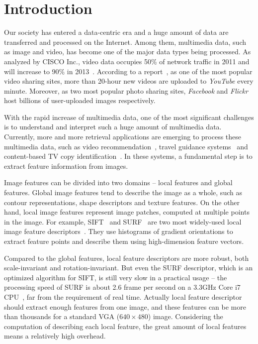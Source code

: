 \section{Introduction}
\label{sec:introduction}

Our society has entered a data-centric era and a huge amount of data are transferred and processed on the Internet. Among them, multimedia data, such as image and video, has become one of the major data types being processed. As analyzed by CISCO Inc., video data occupies 50\% of network traffic in 2011 and will increase to 90\% in 2013~\cite{CISCO2011}.  According to a report~\cite{youtube2009}, as one of the most popular video sharing sites, more than 20-hour new videos are uploaded to \emph{YouTube} every minute. Moreover, as two most popular photo sharing sites, \emph{Facebook} and \emph{Flickr} host billions of user-uploaded images respectively.

With the rapid increase of multimedia data, one of the most significant challenges is to understand and interpret such a huge amount of multimedia data. Currently, more and more retrieval applications are emerging to process these multimedia data, such as video recommendation~\cite{videorecommendation2007}, travel guidance systems~\cite{travelguidance2010} and content-based TV copy identification~\cite{tvidentify2003}. In these systems, a fundamental step is to extract feature information from images. 

Image features can be divided into two domains -- local features and global features. Global image features tend to describe the image as a whole, such as contour representations, shape descriptors and texture features. On the other hand, local image features represent image patches, computed at multiple points in the image. For example, SIFT~\cite{Lowe2004SIFT,RobHess} and SURF~\cite{Bay2006SURF,Evans20009OpenSURF} are two most widely-used local image feature descriptors~\cite{Mikolajczyk2005Evaluation}\cite{Bauer2007Evaluation}. They use histograms of gradient orientations to extract feature points and describe them using high-dimension feature vectors.

Compared to the global features, local feature descriptors are more robust, both scale-invariant and rotation-invariant. But even the SURF descriptor, which is an optimized algorithm for SIFT, is still very slow in a practical usage -- the processing speed of SURF is about 2.6 frame per second on a 3.3GHz Core i7 CPU~\cite{Fang2011ispass}, far from the requirement of real time. Actually local feature descriptor should extract enough features from one image, and these features can be more than thousands for a standard VGA ($640\times480$) image. Considering the computation of describing each local feature, the great amount of local features means a relatively high overhead.

